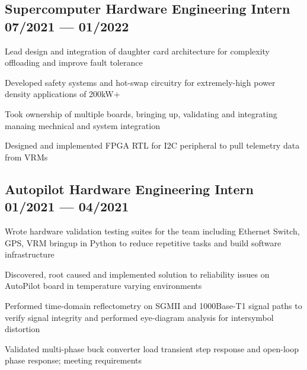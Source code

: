 \documentclass[letter,10pt]{article}
\begin{document}

\subsection{{Supercomputer Hardware Engineering Intern \hfill 07/2021 --- 01/2022}}
\begin{zitemize}
\item Lead design and integration of daughter card architecture for complexity offloading and improve fault tolerance
\item Developed safety systems and hot-swap circuitry for extremely-high power density applications of 200kW+
\item Took ownership of multiple boards, bringing up, validating and integrating manaing mechnical and system integration
\item Designed and implemented FPGA RTL for I2C peripheral to pull telemetry data from VRMs
\end{zitemize}
{\color{sectiondivide} \vspace{-0.75em}\hrulefill}

\subsection{{Autopilot Hardware Engineering Intern \hfill 01/2021 --- 04/2021}}
\begin{zitemize}
\item Wrote hardware validation testing suites for the team including Ethernet Switch, GPS, VRM bringup in Python to reduce repetitive tasks and build software infrastructure
\item Discovered, root caused and implemented solution to reliability issues on AutoPilot board in temperature varying environments
\item Performed time-domain reflectometry on SGMII and 1000Base-T1 signal paths to verify signal integrity and performed eye-diagram analysis for intersymbol distortion
\item Validated multi-phase buck converter load transient step response and open-loop phase response; meeting requirements
\end{zitemize}
{\color{sectiondivide} \vspace{-0.75em}\hrulefill}
\end{document}
